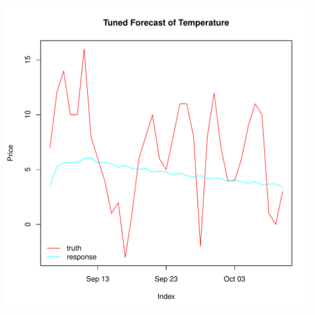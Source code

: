 \documentclass{article}\usepackage[]{graphicx}\usepackage[]{color}
\makeatletter
\def\maxwidth{ %
  \ifdim\Gin@nat@width>\linewidth
    \linewidth
  \else
    \Gin@nat@width
  \fi
}
\newenvironment{knitrout}{}{} %
\theoremstyle{definition}
\makeatother
\begin{document}
\begin{knitrout}
\color{fgcolor}
\includegraphics[width=\maxwidth]{figure/plottbatsTune-1} 

\end{knitrout}
\end{document}
